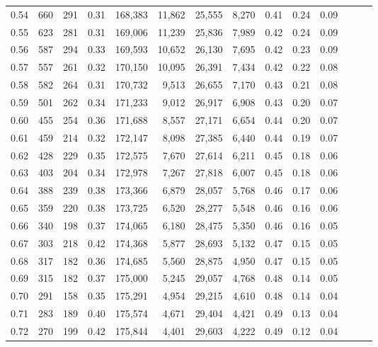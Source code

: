 \begin{tabular}{rrrrrrrrrrrrrr}
0.54 &    660 &  291 &  0.31 &  168,383 &   11,862 &  25,555 &   8,270 &  0.41 &  0.24 &      0.09 \\
0.55 &    623 &  281 &  0.31 &  169,006 &   11,239 &  25,836 &   7,989 &  0.42 &  0.24 &      0.09 \\
0.56 &    587 &  294 &  0.33 &  169,593 &   10,652 &  26,130 &   7,695 &  0.42 &  0.23 &      0.09 \\
0.57 &    557 &  261 &  0.32 &  170,150 &   10,095 &  26,391 &   7,434 &  0.42 &  0.22 &      0.08 \\
0.58 &    582 &  264 &  0.31 &  170,732 &    9,513 &  26,655 &   7,170 &  0.43 &  0.21 &      0.08 \\
0.59 &    501 &  262 &  0.34 &  171,233 &    9,012 &  26,917 &   6,908 &  0.43 &  0.20 &      0.07 \\
0.60 &    455 &  254 &  0.36 &  171,688 &    8,557 &  27,171 &   6,654 &  0.44 &  0.20 &      0.07 \\
0.61 &    459 &  214 &  0.32 &  172,147 &    8,098 &  27,385 &   6,440 &  0.44 &  0.19 &      0.07 \\
0.62 &    428 &  229 &  0.35 &  172,575 &    7,670 &  27,614 &   6,211 &  0.45 &  0.18 &      0.06 \\
0.63 &    403 &  204 &  0.34 &  172,978 &    7,267 &  27,818 &   6,007 &  0.45 &  0.18 &      0.06 \\
0.64 &    388 &  239 &  0.38 &  173,366 &    6,879 &  28,057 &   5,768 &  0.46 &  0.17 &      0.06 \\
0.65 &    359 &  220 &  0.38 &  173,725 &    6,520 &  28,277 &   5,548 &  0.46 &  0.16 &      0.06 \\
0.66 &    340 &  198 &  0.37 &  174,065 &    6,180 &  28,475 &   5,350 &  0.46 &  0.16 &      0.05 \\
0.67 &    303 &  218 &  0.42 &  174,368 &    5,877 &  28,693 &   5,132 &  0.47 &  0.15 &      0.05 \\
0.68 &    317 &  182 &  0.36 &  174,685 &    5,560 &  28,875 &   4,950 &  0.47 &  0.15 &      0.05 \\
0.69 &    315 &  182 &  0.37 &  175,000 &    5,245 &  29,057 &   4,768 &  0.48 &  0.14 &      0.05 \\
0.70 &    291 &  158 &  0.35 &  175,291 &    4,954 &  29,215 &   4,610 &  0.48 &  0.14 &      0.04 \\
0.71 &    283 &  189 &  0.40 &  175,574 &    4,671 &  29,404 &   4,421 &  0.49 &  0.13 &      0.04 \\
0.72 &    270 &  199 &  0.42 &  175,844 &    4,401 &  29,603 &   4,222 &  0.49 &  0.12 &      0.04 \\

\end{tabular}
